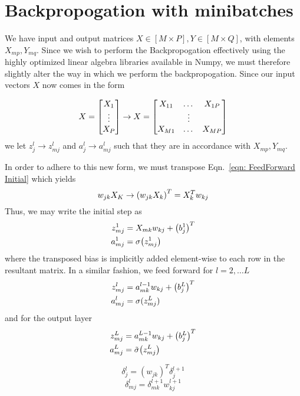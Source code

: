 \documentclass{article}
\begin{document}
    \section*{Backpropogation with minibatches}
    We have input and output matrices $X\in[M\times P], Y\in[M\times Q]$, with elements $X_{mp}, Y_{mq}$. Since we wish to perform the Backpropogation effectively using the highly optimized linear algebra libraries available in Numpy, we must therefore slightly alter the way in which we perform the backpropogation. Since our input vectors $X$ now comes in the form

    \begin{equation}
        X = \qty[
        \begin{matrix}
            X_1 \\ \vdots \\ X_P
        \end{matrix}
        ] \rightarrow
        X = \qty[
        \begin{matrix}
            X_{11} & \dots & X_{1P} \\
                     & \vdots&          \\
            X_{M1} & \dots & X_{MP}
        \end{matrix}
        ]
    \end{equation}
    we let $z^l_j \rightarrow z^l_{mj}$ and $a^l_{j}\rightarrow a^l_{mj}$ such that they are in accordance with $X_{mp}, Y_{mq}$.

    In order to adhere to this new form, we must transpose Eqn.~\ref{eqn: FeedForward Initial} which yields
    \begin{equation}
        w_{jk}X_K \rightarrow \qty(w_{jk}X_k)^T = X_k^Tw_{kj}
    \end{equation}
    Thus, we may write the initial step as
    \begin{align}
        \begin{split}
            z^1_{mj} &= X_{mk}w_{kj} + \qty(b^1_j)^T \\
            a^1_{mj} &= \sigma\qty(z^1_{mj})
        \end{split}
    \end{align}
    where the transposed bias is implicitly added element-wise to each row in the resultant matrix. In a similar fashion, we feed forward for $l = 2, \dots L$
    \begin{align}
        \begin{split}
            z^l_{mj} &= a^{l-1}_{mk}w_{kj} + \qty(b^L_j)^T \\
            a^l_{mj} &= \sigma(z^L_{mj})
        \end{split}
    \end{align}
    and for the output layer
    \begin{align}
        \begin{split}
            z^L_{mj} &= a^{L-1}_{mk}w_{kj} + \qty(b^L_j)^T \\
            a^L_{mj} &= \tilde\sigma\qty(z^L_{mj})
        \end{split}
    \end{align}

    \begin{equation}
        \delta^{l}_j = (w_{jk})^T \delta^{l+1}_j
    \end{equation}
    \begin{equation}
        \delta^{l}_{mj} = \delta^{l+1}_{mk}w^{l+1}_{kj}
    \end{equation}
\end{document}
